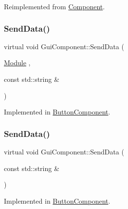 Reimplemented from \mbox{\hyperlink{class_component_a2d6c81535df008c6788ba21d0812ed44}{Component}}.

\mbox{\label{class_gui_component_a131dadcfcbe0278cf6c995a64cca871f}} 
\subsubsection{\texorpdfstring{SendData()}{SendData()}\hspace{0.1cm}{\footnotesize\ttfamily [1/2]}}
{\footnotesize\ttfamily virtual void Gui\+Component\+::\+Send\+Data (\begin{DoxyParamCaption}\item[{\mbox{\hyperlink{_mediator_2_mediator_2_commons_8h_a88683b64d84542943724ba0f211153af}{Module}}}]{,  }\item[{const std\+::string \&}]{ }\end{DoxyParamCaption})\hspace{0.3cm}{\ttfamily [pure virtual]}}



Implemented in \mbox{\hyperlink{class_button_component_ab2bda034c7b604ed198d5c276b7fd045}{Button\+Component}}.

\mbox{\label{class_gui_component_a50da12b404e7ef1adbebafdabd66884f}} 
\subsubsection{\texorpdfstring{SendData()}{SendData()}\hspace{0.1cm}{\footnotesize\ttfamily [2/2]}}
{\footnotesize\ttfamily virtual void Gui\+Component\+::\+Send\+Data (\begin{DoxyParamCaption}\item[{const std\+::string \&}]{ }\end{DoxyParamCaption})\hspace{0.3cm}{\ttfamily [pure virtual]}}



Implemented in \mbox{\hyperlink{class_button_component_a4eb3aac3bc35d95f8d703da25697917c}{Button\+Component}}.

\mbox{\label{class_gui_component_a27d0d28dbc048b7cd3ad63e8a1961021}} 

